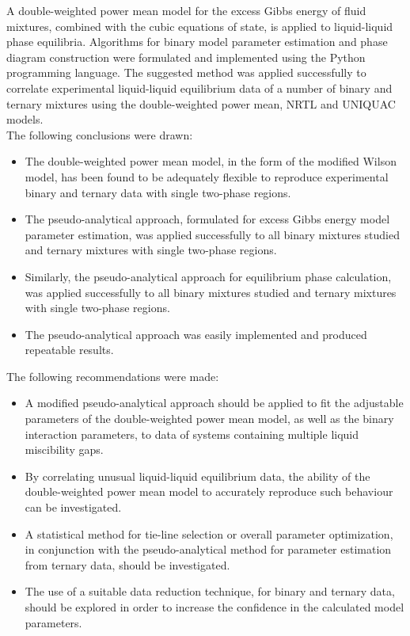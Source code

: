 
A double-weighted power mean model for the excess Gibbs energy of fluid mixtures, combined with the cubic equations of state, is applied to liquid-liquid phase equilibria. Algorithms for binary model parameter estimation and phase diagram construction were formulated and implemented using the Python programming language. The suggested method was applied successfully to correlate experimental liquid-liquid equilibrium data of a number of binary and ternary mixtures using the double-weighted power mean, NRTL and UNIQUAC models.\\

The following conclusions were drawn:\
\begin{itemize}
\item The double-weighted power mean model, in the form of the modified Wilson model, has been found to be adequately flexible to reproduce experimental binary and ternary data with single two-phase regions.\
\item The pseudo-analytical approach, formulated for excess Gibbs energy model parameter estimation, was applied successfully to all binary mixtures studied and ternary mixtures with single two-phase regions.\
\item Similarly, the pseudo-analytical approach for equilibrium phase calculation, was applied successfully to all binary mixtures studied and ternary mixtures with single two-phase regions.\
\item The pseudo-analytical approach was easily implemented and produced repeatable results.\
\end{itemize}

The following recommendations were made:\
\begin{itemize}
\item A modified pseudo-analytical approach should be applied to fit the adjustable parameters of the double-weighted power mean model, as well as the binary interaction parameters, to data of systems containing multiple liquid miscibility gaps.\
\item By correlating unusual liquid-liquid equilibrium data, the ability of the double-weighted power mean model to accurately reproduce such behaviour can be investigated.\
\item A statistical method for tie-line selection or overall parameter optimization, in conjunction with the pseudo-analytical method for parameter estimation from ternary data, should be investigated.\
\item The use of a suitable data reduction technique, for binary and ternary data, should be explored in order to increase the confidence in the calculated model parameters.
\end{itemize}

